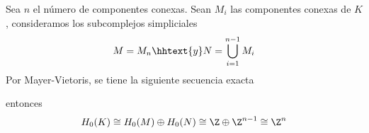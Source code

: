 \documentclass{article}
\begin{document}
\begin{enumerate}
    \vspace{1mm}
    Sea $n$ el número de componentes conexas. Sean $M_{i}$ las componentes conexas de $K$, 
    consideramos los subcomplejos simpliciales
    \begin{equation*}
        M=M_{n} \hhtext{y} N=\bigcup_{i=1}^{n-1}M_{i}
    \end{equation*}
    Por Mayer-Vietoris, se tiene la siguiente secuencia exacta
    
    \vspace{2mm}
    \centerline{
    }
    entonces
    \begin{equation*}
        H_{0}(K)\cong H_{0}(M)\oplus H_{0}(N)\cong\Z\oplus\Z^{n-1}\cong\Z^{n}
    \end{equation*}
\end{enumerate}

\end{document}
